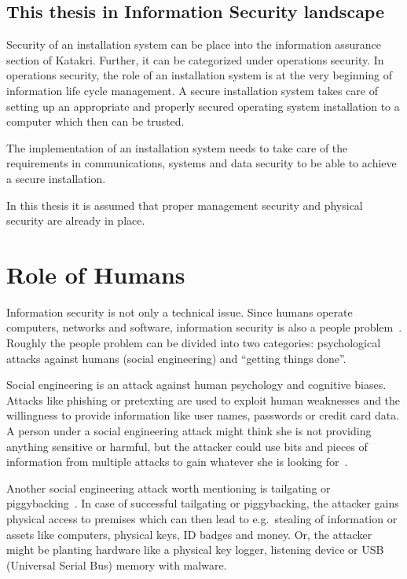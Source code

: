 \subsection{This thesis in Information Security landscape}

Security of an installation system can be place into the information
assurance section of Katakri. Further, it can be categorized under
operations security. In operations security, the role of an
installation system is at the very beginning of information life cycle
management. A secure installation system takes care of setting up
an appropriate and properly secured operating system installation to
a computer which then can be trusted.

The implementation of an installation system needs to take care of the
requirements in communications, systems and data security to be able
to achieve a secure installation.

In this thesis it is assumed that proper management security and
physical security are already in place.


\section{Role of Humans}

Information security is not only a technical issue. Since humans
operate computers, networks and software, information security is also
a people problem~\cite{parsons2010human}\cite{anderson}. Roughly the
people problem can be divided into two categories: psychological
attacks against humans (social engineering) and ``getting things
done''.

Social engineering is an attack against human psychology and cognitive
biases. Attacks like phishing or pretexting are used to exploit human
weaknesses and the willingness to provide information like user names,
passwords or credit card data. A person under a social engineering
attack might think she is not providing anything sensitive or harmful,
but the attacker could use bits and pieces of information from
multiple attacks to gain whatever she is looking
for~\cite{greavu2014social}\cite{anderson}.

Another social engineering attack worth mentioning is tailgating or
piggybacking~\cite{fairbrother2014insider}. In case of successful
tailgating or piggybacking, the attacker gains physical access to
premises which can then lead to e.g.\ stealing of information or
assets like computers, physical keys, ID badges and money. Or, the
attacker might be planting hardware like a physical key logger,
listening device or USB (Universal Serial Bus) memory with malware.

